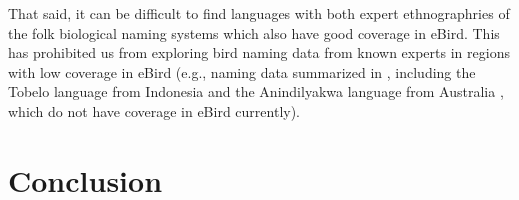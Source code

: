 \documentclass[10pt,letterpaper]{article}
\begin{document}
That said, it can be difficult to find languages with both expert ethnographries of the folk biological naming systems which also have good coverage in eBird. This has prohibited us from exploring bird naming data from known experts in regions with low coverage in eBird (e.g., naming data summarized in \cite{holman2002relation}, including the Tobelo language from Indonesia \cite{taylor1990folk} and the Anindilyakwa language from Australia \cite{waddy1988classification}, which do not have coverage in eBird currently).

\section{Conclusion}





\end{document}
